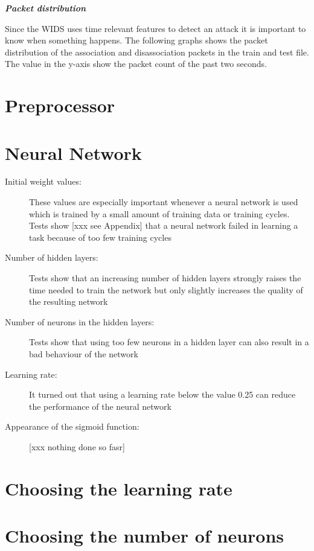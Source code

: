 {\em {\bf Packet distribution}}

Since the WIDS uses time relevant features to detect an attack it is important to know when something happens. The following graphs shows the packet distribution of the association and disassociation packets in the train and test file. The value in the y-axis show the packet count of the past two seconds.



\section{Preprocessor}

\section{Neural Network}

\begin{description}

	\item [Initial weight values:] These values are especially important whenever a neural network is used which is trained by a small amount of training data or training cycles. Tests show [xxx see Appendix] that a neural network failed in learning a task because of too few training cycles
    \item [Number of hidden layers:] Tests show that an increasing number of hidden layers strongly raises the time needed to train the network but only slightly increases the quality of the resulting network
	\item [Number of neurons in the hidden layers:] Tests show that using too few neurons in a hidden layer can also result in a bad behaviour of the network
	\item [Learning rate:] It turned out that using a learning rate below the value 0.25 can reduce the performance of the neural network
	\item [Appearance of the sigmoid function:] [xxx nothing done so fasr]
\end{description}

\section{Choosing the learning rate}

\section{Choosing the number of neurons}

